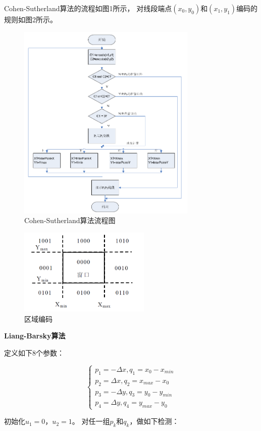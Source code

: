 \documentclass[a4paper,UTF8]{article}
\begin{document}
Cohen-Sutherland算法的流程如图1所示，
对线段端点$(x_0,y_0)$和$(x_1,y_1)$编码的规则如图2所示。
\begin{figure}[H]
    \centering
    \includegraphics[width=8.55cm,height=9.5cm]{cohen-sutherland-flow.PNG}
    \caption{Cohen-Sutherland算法流程图}
\end{figure}
\begin{figure}[H]
    \centering
    \includegraphics[width=6.28cm,height=4.14cm]{cohen-sutherland-encode.PNG}
    \caption{区域编码}
\end{figure}


\textbf{Liang-Barsky算法}

定义如下8个参数：

\begin{equation*}
    \begin{cases}
        p_1=-\Delta x,q_1=x_0-x_{min}\\
        p_2=\Delta x,q_2=x_{max}-x_0\\
        p_3=-\Delta y,q_3=y_0-y_{min}\\
        p_4=\Delta y,q_4=y_{max}-y_0
    \end{cases}
\end{equation*}

初始化$u_1=0$，$u_2=1$。
对任一组$p_k$和$q_k$，做如下检测：
\end{document}
